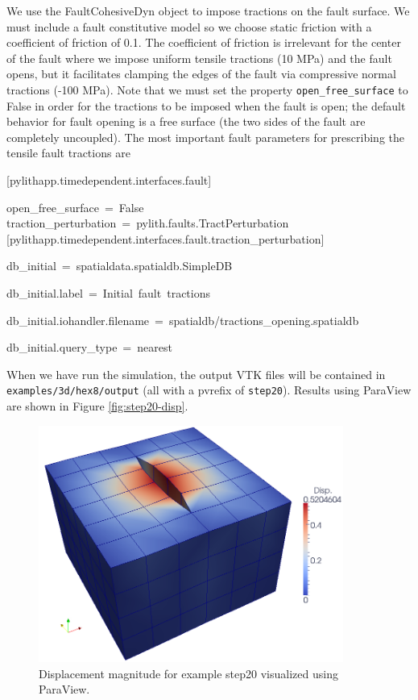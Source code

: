 We use the FaultCohesiveDyn object to impose tractions on the fault
surface. We must include a fault constitutive model so we choose static
friction with a coefficient of friction of 0.1. The coefficient of
friction is irrelevant for the center of the fault where we impose
uniform tensile tractions (10 MPa) and the fault opens, but it facilitates
clamping the edges of the fault via compressive normal tractions (-100
MPa). Note that we must set the property \texttt{open\_free\_surface}
to False in order for the tractions to be imposed when the fault is
open; the default behavior for fault opening is a free surface (the
two sides of the fault are completely uncoupled). The most important
fault parameters for prescribing the tensile fault tractions are
\begin{lyxcode}
{[}pylithapp.timedependent.interfaces.fault{]}

open\_free\_surface~=~False~\\


traction\_perturbation~=~pylith.faults.TractPerturbation~\\


{[}pylithapp.timedependent.interfaces.fault.traction\_perturbation{]}

db\_initial~=~spatialdata.spatialdb.SimpleDB

db\_initial.label~=~Initial~fault~tractions

db\_initial.iohandler.filename~=~spatialdb/tractions\_opening.spatialdb

db\_initial.query\_type~=~nearest~
\end{lyxcode}
When we have run the simulation, the output VTK files will be contained
in \texttt{examples/3d/hex8/output} (all with a pvrefix of \texttt{step20}).
Results using ParaView are shown in Figure \vref{fig:step20-disp}.

\begin{figure}
\begin{centering}
\includegraphics[width=10cm]{tutorials/3dhex8/figs/step20_disp}
\par\end{centering}

\caption{Displacement magnitude for example step20 visualized using ParaView.
\label{fig:step20-disp}}
\end{figure}

